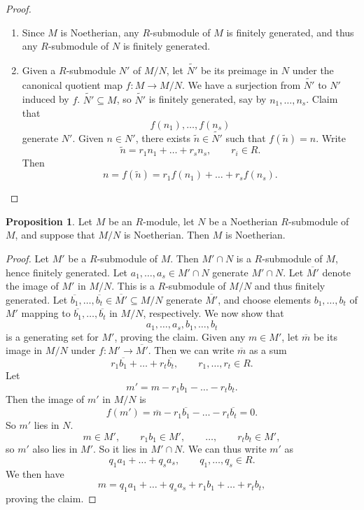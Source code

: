 \documentclass{article}
\newcommand{\rb}[1]{\left( #1 \right)}
\theoremstyle{definition}\newtheorem{definition}{Definition}[subsection]
\theoremstyle{definition}\newtheorem{remark}[definition]{Remark}
\theoremstyle{definition}\newtheorem*{example}{Example}
\theoremstyle{definition}\newtheorem*{note}{Note}
\newtheorem{proposition}[definition]{Proposition}
\begin{document}
\begin{proof}
\hfill
\begin{enumerate}
\item Since $ M $ is Noetherian, any $ R $-submodule of $ M $ is finitely generated, and thus any $ R $-submodule of $ N $ is finitely generated.
\item Given a $ R $-submodule $ N' $ of $ M / N $, let $ \widetilde{N'} $ be its preimage in $ N $ under the canonical quotient map $ f : M \to M / N $. We have a surjection from $ \widetilde{N'} $ to $ N' $ induced by $ f $. $ \widetilde{N'} \subseteq M $, so $ \widetilde{N'} $ is finitely generated, say by $ n_1, \dots, n_s $. Claim that
$$ f\rb{n_1}, \dots, f\rb{n_s} $$
generate $ N' $. Given $ n \in N' $, there exists $ \widetilde{n} \in \widetilde{N'} $ such that $ f\rb{\widetilde{n}} = n $. Write
$$ \widetilde{n} = r_1n_1 + \dots + r_sn_s, \qquad r_i \in R. $$
Then
$$ n = f\rb{\widetilde{n}} = r_1f\rb{n_1} + \dots + r_sf\rb{n_s}. $$
\end{enumerate}
\end{proof}

\begin{proposition}
Let $ M $ be an $ R $-module, let $ N $ be a Noetherian $ R $-submodule of $ M $, and suppose that $ M / N $ is Noetherian. Then $ M $ is Noetherian.
\end{proposition}

\begin{proof}
Let $ M' $ be a $ R $-submodule of $ M $. Then $ M' \cap N $ is a $ R $-submodule of $ M $, hence finitely generated. Let $ a_1, \dots, a_s \in M' \cap N $ generate $ M' \cap N $. Let $ \overline{M'} $ denote the image of $ M' $ in $ M / N $. This is a $ R $-submodule of $ M / N $ and thus finitely generated. Let $ \overline{b_1}, \dots, \overline{b_t} \in \overline{M'} \subseteq M / N $ generate $ \overline{M'} $, and choose elements $ b_1, \dots, b_t $ of $ M' $ mapping to $ \overline{b_1}, \dots, \overline{b_t} $ in $ M / N $, respectively. We now show that
$$ a_1, \dots, a_s, b_1, \dots, b_t $$
is a generating set for $ M' $, proving the claim. Given any $ m \in M' $, let $ \overline{m} $ be its image in $ M / N $ under $ f : M' \to \overline{M'} $. Then we can write $ \overline{m} $ as a sum
$$ r_1\overline{b_1} + \dots + r_t\overline{b_t}, \qquad r_1, \dots, r_t \in R. $$
Let
$$ m' = m - r_1b_1 - \dots - r_tb_t. $$
Then the image of $ m' $ in $ M / N $ is
$$ f\rb{m'} = \overline{m} - r_1\overline{b_1} - \dots - r_t\overline{b_t} = 0. $$
So $ m' $ lies in $ N $.
$$ m \in M', \qquad r_1b_1 \in M', \qquad \dots, \qquad r_tb_t \in M', $$
so $ m' $ also lies in $ M' $. So it lies in $ M' \cap N $. We can thus write $ m' $ as
$$ q_1a_1 + \dots + q_sa_s, \qquad q_1, \dots, q_s \in R. $$
We then have
$$ m = q_1a_1 + \dots + q_sa_s + r_1b_1 + \dots + r_tb_t, $$
proving the claim.
\end{proof}
\end{document}
